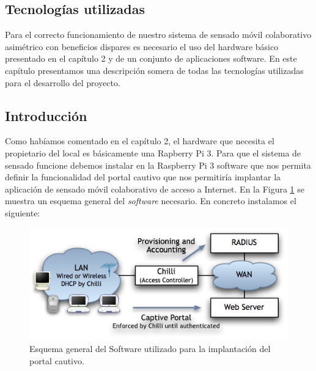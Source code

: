 \clearpage
{}%
\begin{center}
\begin{minipage}{.75\textwidth}
\section{Tecnologías utilizadas}

Para el correcto funcionamiento de nuestro sistema de sensado móvil colaborativo asimétrico con beneficios dispares es necesario el uso del hardware básico presentado en el capítulo 2 y de un conjunto de aplicaciones software. En este capítulo presentamos una descripción somera de todas las tecnologías utilizadas para el desarrollo del proyecto. %
\end{minipage}
\end{center}
\clearpage%

\sloppy
\subsection{Introducción}
Como habíamos comentado en el capítulo 2, el hardware que necesita el propietario del local es básicamente una Rapberry Pi 3. Para que el sistema de sensado funcione debemos instalar en la Raspberry Pi 3 software que nos permita definir la funcionalidad del portal cautivo que nos permitiría implantar la aplicación de sensado móvil colaborativo de acceso a Internet. En la Figura \ref{CoovaScheme} se muestra un esquema general del \emph{software} necesario. En concreto instalamos el siguiente:

\begin{figure}[!t]
\begin{center}
\includegraphics[width=0.75\linewidth]{./3_Tecnologias/Img/CoovaScheme.jpg}
\end{center}
\caption{Esquema general del Software utilizado para la implantación del portal cautivo.}
\label{CoovaScheme}
\end{figure}

